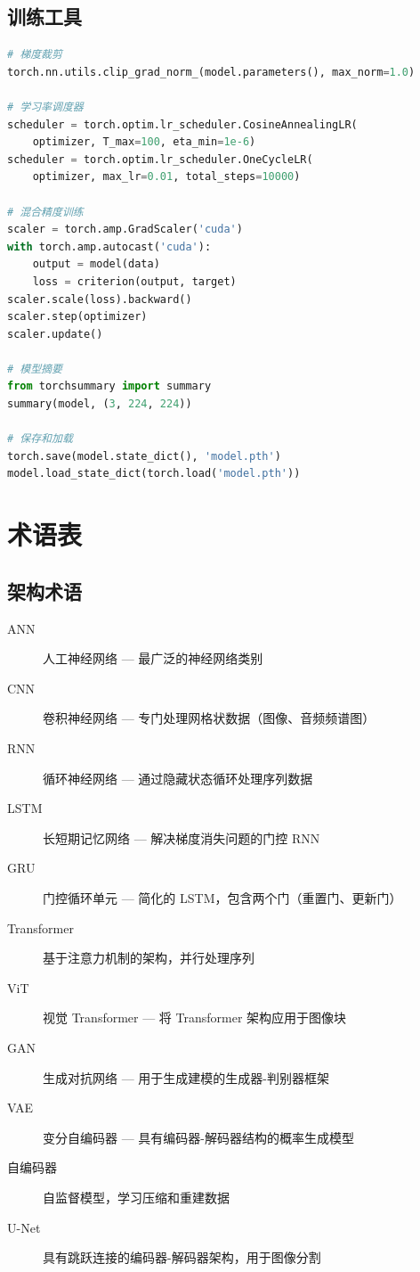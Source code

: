 \section{训练工具}

\begin{lstlisting}[language=Python, caption={常用训练工具}]
# 梯度裁剪
torch.nn.utils.clip_grad_norm_(model.parameters(), max_norm=1.0)

# 学习率调度器
scheduler = torch.optim.lr_scheduler.CosineAnnealingLR(
    optimizer, T_max=100, eta_min=1e-6)
scheduler = torch.optim.lr_scheduler.OneCycleLR(
    optimizer, max_lr=0.01, total_steps=10000)

# 混合精度训练
scaler = torch.amp.GradScaler('cuda')
with torch.amp.autocast('cuda'):
    output = model(data)
    loss = criterion(output, target)
scaler.scale(loss).backward()
scaler.step(optimizer)
scaler.update()

# 模型摘要
from torchsummary import summary
summary(model, (3, 224, 224))

# 保存和加载
torch.save(model.state_dict(), 'model.pth')
model.load_state_dict(torch.load('model.pth'))
\end{lstlisting}

\chapter{术语表}

\section{架构术语}

\begin{description}
    \item[ANN] 人工神经网络 --- 最广泛的神经网络类别
    \item[CNN] 卷积神经网络 --- 专门处理网格状数据（图像、音频频谱图）
    \item[RNN] 循环神经网络 --- 通过隐藏状态循环处理序列数据
    \item[LSTM] 长短期记忆网络 --- 解决梯度消失问题的门控 RNN
    \item[GRU] 门控循环单元 --- 简化的 LSTM，包含两个门（重置门、更新门）
    \item[Transformer] 基于注意力机制的架构，并行处理序列
    \item[ViT] 视觉 Transformer --- 将 Transformer 架构应用于图像块
    \item[GAN] 生成对抗网络 --- 用于生成建模的生成器-判别器框架
    \item[VAE] 变分自编码器 --- 具有编码器-解码器结构的概率生成模型
    \item[自编码器] 自监督模型，学习压缩和重建数据
    \item[U-Net] 具有跳跃连接的编码器-解码器架构，用于图像分割
\end{description}

